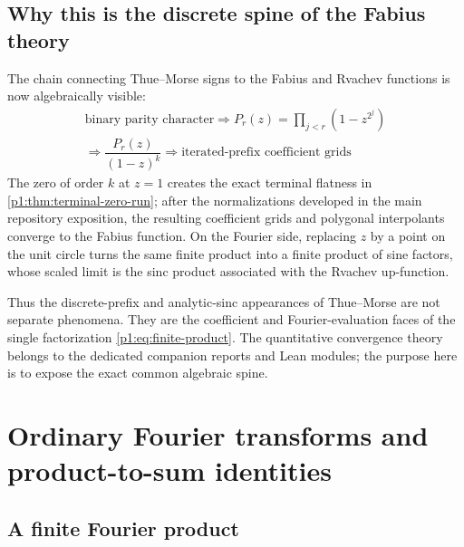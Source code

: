 \documentclass[11pt,oneside]{article}
\numberwithin{equation}{section}
\theoremstyle{definition}
\theoremstyle{remark}
\begin{document}
\subsection{Why this is the discrete spine of the Fabius theory}

The chain connecting Thue--Morse signs to the Fabius and Rvachev functions is
now algebraically visible:
\begin{equation}
 \boxed{\begin{gathered}
 \text{binary parity character}
 \Longrightarrow
 P_r(z)=\prod_{j<r}(1-z^{2^j})\\
 \Longrightarrow
 \dfrac{P_r(z)}{(1-z)^k}
 \Longrightarrow
 \text{iterated-prefix coefficient grids}
 \end{gathered}}
 \label{p1:eq:fabius-discrete-chain}
\end{equation}
The zero of order \(k\) at \(z=1\) creates the exact terminal flatness in
\cref{p1:thm:terminal-zero-run}; after the normalizations developed in the main
repository exposition, the resulting coefficient grids and polygonal
interpolants converge to the Fabius function.  On the Fourier side, replacing
\(z\) by a point on the unit circle turns the same finite product into a
finite product of sine factors, whose scaled limit is the sinc product
associated with the Rvachev up-function.

Thus the discrete-prefix and analytic-sinc appearances of Thue--Morse are not
separate phenomena.  They are the coefficient and Fourier-evaluation faces of
the single factorization \eqref{p1:eq:finite-product}.  The quantitative
convergence theory belongs to the dedicated companion reports and Lean
modules; the purpose here is to expose the exact common algebraic spine.

\section[Fourier transforms]{Ordinary Fourier transforms and product-to-sum identities}
\label{p1:sec:fourier}

\subsection{A finite Fourier product}
\end{document}
